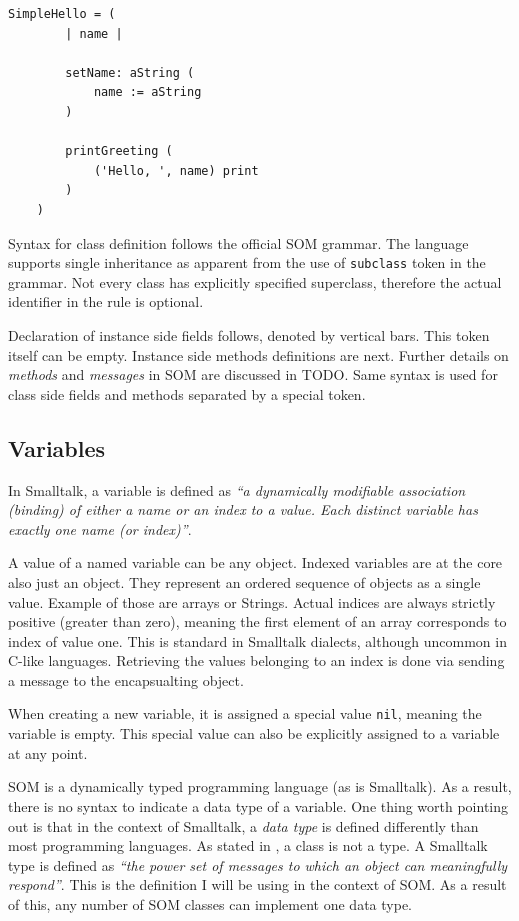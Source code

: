 \documentclass[thesis=M,english]{FITthesis}[2019/12/23]
\begin{document}
\begin{lstlisting}[language=Smalltalk]
	SimpleHello = (
		| name |

		setName: aString (
			name := aString
		)

		printGreeting (
			('Hello, ', name) print
		)
	)
\end{lstlisting}

Syntax for class definition follows the official SOM grammar. The language supports single inheritance as apparent from the use
of \texttt{subclass} token in the grammar. Not every class has explicitly specified superclass, therefore the actual identifier in
the rule is optional.

Declaration of instance side fields follows, denoted by vertical bars. This token itself can be empty. Instance side methods definitions
are next. Further details on \textit{methods} and \textit{messages} in SOM are discussed in TODO. %
Same syntax is used for class side fields and methods separated by a special token.

\subsection{Variables}
In Smalltalk, a variable is defined as \textit{``a dynamically modifiable association (binding) of either a name
or an index to a value. Each distinct variable has exactly one name (or index)''}\cite{smalltalk-essentials}.

A value of a named variable can be any object. Indexed variables are at the core also just an object. They
represent an ordered sequence of objects as a single value. Example of those are arrays or Strings. Actual
indices are always strictly positive (greater than zero), meaning the first element of an array corresponds
to index of value one. This is standard in Smalltalk dialects, although uncommon in C-like languages. Retrieving
the values belonging to an index is done via sending a message to the encapsualting object.

When creating a new variable, it is assigned a special value \texttt{nil}, meaning the variable is empty. This
special value can also be explicitly assigned to a variable at any point.

SOM is a dynamically typed programming language (as is Smalltalk). As a result, there is no syntax to indicate
a data type of a variable. One thing worth pointing out is that in the context of Smalltalk, a \textit{data type}
is defined differently than most programming languages. As stated in \cite{smalltalk-essentials}, a class is not
a type. A Smalltalk type is defined as \textit{``the power set of messages to which an object can meaningfully
respond''}\cite{smalltalk-essentials}. This is the definition I will be using in the context of SOM. As a result
of this, any number of SOM classes can implement one data type.
\end{document}
